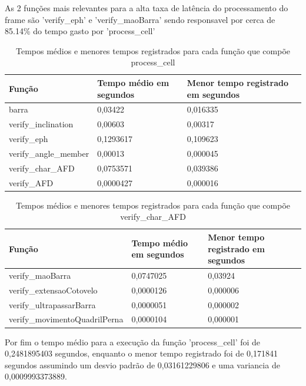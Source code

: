 As 2 funções mais relevantes para a alta taxa de latência do processamento do frame são 'verify\_eph' e 'verify\_maoBarra' sendo responsavel por cerca de 85.14\% do tempo gasto por 'process\_cell'



\begin{table}[h]
	\centering
	\begin{tabular}{|p{6cm}|p{3cm}|p{5cm}|}
	\hline
	\textbf{Função} & \textbf{Tempo médio em segundos} & \textbf{Menor tempo registrado em segundos} \\
	\hline
	barra & 0,03422 & 0,016335 \\
	verify\_inclination & 0,00603 & 0,00317 \\
	verify\_eph & 0,1293617 & 0,109623 \\
	verify\_angle\_member & 0,00013 & 0,000045 \\
	verify\_char\_AFD & 0,0753571 & 0,039386 \\
	verify\_AFD & 0,0000427 & 0,000016 \\
	\hline
	\end{tabular}
	\caption{Tempos médios e menores tempos registrados para cada função que compõe process\_cell}
	\label{tab:tempos_funcoes}
\end{table}



\begin{table}[h]
	\centering
	\begin{tabular}{|p{6cm}|p{3cm}|p{5cm}|}
	\hline
	\textbf{Função} & \textbf{Tempo médio em segundos} & \textbf{Menor tempo registrado em segundos} \\
	\hline
	verify\_maoBarra & 0,0747025 & 0,03924 \\
	verify\_extensaoCotovelo & 0,0000126 & 0,000006  \\
	verify\_ultrapassarBarra & 0,0000051 & 0,000002  \\
	verify\_movimentoQuadrilPerna & 0,0000104 & 0,000001  \\
	\hline
	\end{tabular}
	\caption{Tempos médios e menores tempos registrados para cada função que compõe verify\_char\_AFD}
	\label{tab:tempos_funcoes_especificas}
\end{table}
	
Por fim  o tempo médio para a execução da função 'process\_cell' foi de 0,2481895403 segundos, enquanto o menor tempo registrado foi de 0,171841 segundos assumindo um desvio padrão de 0,03161229806 e uma variancia de 0,0009993373889.

